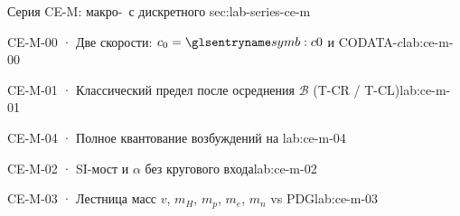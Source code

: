 
\begin{labseries}{Серия CE-M: макро-\Tlayer\ с дискретного \Mlayer}{sec:lab-series-ce-m}

\begin{labrecord}{CE-M-00 · Две скорости: $c_0=\caSignalSpeed$ и CODATA-$c$}{lab:ce-m-00}

\end{labrecord}

\begin{labrecord}{CE-M-01 · Классический предел после осреднения $\mathcal{B}$ (T-CR / T-CL)}{lab:ce-m-01}

\end{labrecord}

\begin{labrecord}{CE-M-04 · Полное квантование возбуждений на \Mlayer}{lab:ce-m-04}

\end{labrecord}

\begin{labrecord}{CE-M-02 · SI-мост и $\alpha$ без кругового входа}{lab:ce-m-02}

\end{labrecord}

\begin{labrecord}{CE-M-03 · Лестница масс $v$, $m_H$, $m_p$, $m_e$, $m_n$ vs PDG}{lab:ce-m-03}

\end{labrecord}

\end{labseries}
